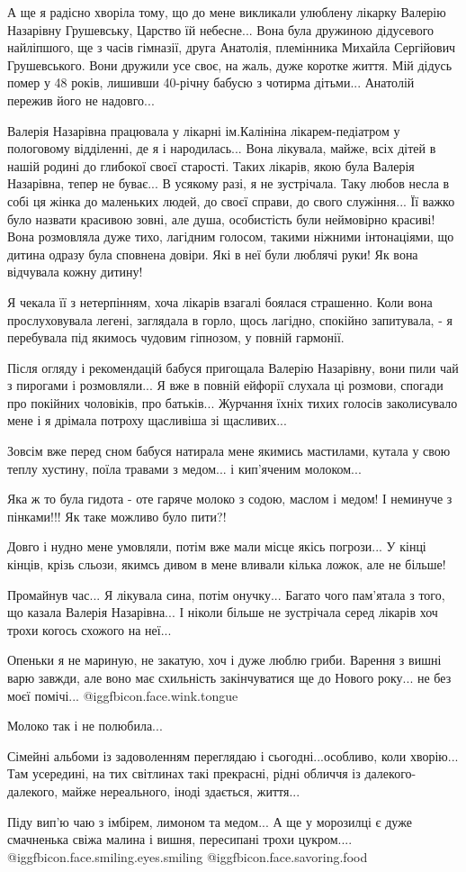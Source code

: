 А ще я радісно хворіла тому, що до мене викликали улюблену лікарку Валерію
Назарівну Грушевську, Царство їй небесне... Вона була дружиною дідусевого
найліпшого, ще з часів гімназії, друга Анатолія, племінника Михайла Сергійович
Грушевського. Вони дружили усе своє, на жаль, дуже коротке життя. Мій дідусь
помер у 48 років, лишивши 40-річну бабусю з чотирма дітьми... Анатолій пережив
його не надовго... 

Валерія Назарівна працювала у лікарні ім.Калініна лікарем-педіатром у
пологовому відділенні, де я і народилась... Вона лікувала, майже, всіх дітей в
нашій родині до глибокої своєї старості. Таких лікарів, якою була Валерія
Назарівна, тепер не буває... В усякому разі, я не зустрічала. Таку любов несла
в собі ця жінка до маленьких людей, до своєї справи, до свого служіння... Її
важко було назвати красивою зовні, але душа, особистість були неймовірно
красиві! Вона розмовляла дуже тихо, лагідним голосом, такими ніжними
інтонаціями, що дитина одразу була сповнена довіри. Які в неї були люблячі
руки! Як вона відчувала кожну дитину! 

Я чекала її з нетерпінням, хоча лікарів взагалі боялася страшенно. Коли вона
прослуховувала легені, заглядала в горло, щось лагідно, спокійно запитувала, -
я перебувала під якимось чудовим гіпнозом, у повній гармонії. 

Після огляду і рекомендацій бабуся пригощала Валерію Назарівну, вони пили чай з
пирогами і розмовляли... Я вже в повній ейфорії слухала ці розмови, спогади про
покійних чоловіків, про батьків... Журчання їхніх тихих голосів заколисувало
мене і я дрімала потроху щасливіша зі щасливих... 

Зовсім вже перед сном бабуся натирала мене якимись мастилами, кутала у свою
теплу хустину, поїла травами з медом... і кип'яченим молоком... 

Яка ж то була гидота - оте гаряче молоко з содою, маслом і медом! І неминуче з
пінками!!! Як таке можливо було пити?! 

Довго і нудно мене умовляли, потім вже мали місце якісь погрози... У кінці
кінців, крізь сльози, якимсь дивом в мене вливали кілька ложок, але не більше! 

Промайнув час... Я лікувала сина, потім онучку... Багато чого пам'ятала з того,
що казала Валерія Назарівна... І ніколи більше не зустрічала серед лікарів хоч
трохи когось схожого на неї... 

Опеньки я не мариную, не закатую, хоч і дуже люблю гриби. Варення з вишні варю
завжди, але воно має схильність закінчуватися ще до Нового року... не без моєї
помічі...  @igg{fbicon.face.wink.tongue} 

Молоко так і не полюбила... 

Сімейні альбоми із задоволенням переглядаю і сьогодні...особливо, коли
хворію... Там усередині, на тих світлинах такі прекрасні, рідні обличчя із
далекого- далекого, майже нереального, іноді здається, життя... 

Піду вип'ю чаю з імбірем, лимоном та медом... А ще у морозилці є дуже
смачненька свіжа малина і вишня, пересипані  трохи цукром....
@igg{fbicon.face.smiling.eyes.smiling}  @igg{fbicon.face.savoring.food} 

